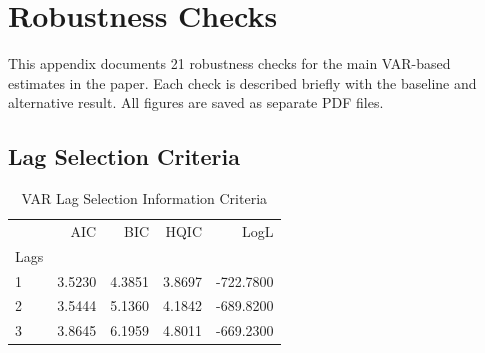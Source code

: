 \appendix
\section{Robustness Checks}
\label{sec:robustness}

This appendix documents 21 robustness checks for the main VAR-based estimates
in the paper. Each check is described briefly with the baseline and alternative
result. All figures are saved as separate PDF files.


\subsection{Lag Selection Criteria}
\label{sec:lagsel}
\begin{table}
\caption{VAR Lag Selection Information Criteria}
\label{tab:lag_sel_app}
\begin{tabular}{lrrrr}
\toprule
 & AIC & BIC & HQIC & LogL \\
Lags &  &  &  &  \\
\midrule
1 & 3.5230 & 4.3851 & 3.8697 & -722.7800 \\
2 & 3.5444 & 5.1360 & 4.1842 & -689.8200 \\
3 & 3.8645 & 6.1959 & 4.8011 & -669.2300 \\
\bottomrule
\end{tabular}
\end{table}



